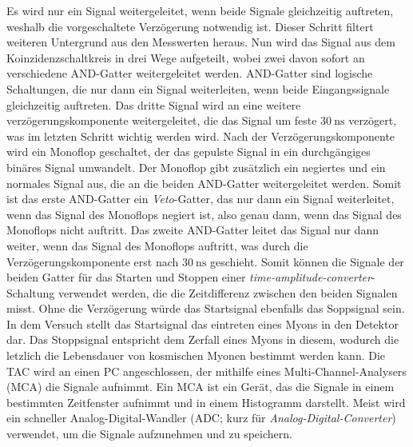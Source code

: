 Es wird nur ein Signal weitergeleitet, wenn beide Signale gleichzeitig auftreten, weshalb die vorgeschaltete Verzögerung notwendig ist.
Dieser Schritt filtert weiteren Untergrund aus den Messwerten heraus.\newline
Nun wird das Signal aus dem Koinzidenzschaltkreis in drei Wege aufgeteilt, wobei zwei davon sofort an verschiedene AND-Gatter weitergeleitet werden.
AND-Gatter sind logische Schaltungen, die nur dann ein Signal weiterleiten, wenn beide Eingangssignale gleichzeitig auftreten.
Das dritte Signal wird an eine weitere verzögerungskomponente weitergeleitet, die das Signal um feste $\SI{30}{\nano\second}$ verzögert, was im letzten Schritt wichtig werden wird.
Nach der Verzögerungskomponente wird ein Monoflop geschaltet, der das gepulste Signal in ein durchgängiges binäres Signal umwandelt.
Der Monoflop gibt zusätzlich ein negiertes und ein normales Signal aus, die an die beiden AND-Gatter weitergeleitet werden.
Somit ist das erste AND-Gatter ein \textit{Veto}-Gatter, das nur dann ein Signal weiterleitet, wenn das Signal des Monoflops negiert ist, also genau dann, wenn das Signal des Monoflops nicht auftritt.
Das zweite AND-Gatter leitet das Signal nur dann weiter, wenn das Signal des Monoflops auftritt, was durch die Verzögerungskomponente erst nach $\SI{30}{\nano\second}$ geschieht.
Somit können die Signale der beiden Gatter für das Starten und Stoppen einer \textit{time-amplitude-converter}-Schaltung verwendet werden, die die Zeitdifferenz zwischen den beiden Signalen misst.
Ohne die Verzögerung würde das Startsignal ebenfalls das Soppsignal sein.
In dem Versuch stellt das Startsignal das eintreten eines Myons in den Detektor dar.
Das Stoppsignal entspricht dem Zerfall eines Myons in diesem, wodurch die letzlich die Lebensdauer von kosmischen Myonen bestimmt werden kann. \newline
Die TAC wird an einen PC angeschlossen, der mithilfe eines Multi-Channel-Analysers (MCA) die Signale aufnimmt.
Ein MCA ist ein Gerät, das die Signale in einem bestimmten Zeitfenster aufnimmt und in einem Histogramm darstellt.
Meist wird ein schneller Analog-Digital-Wandler (ADC; kurz für \textit{Analog-Digital-Converter}) verwendet, um die Signale aufzunehmen und zu speichern.
